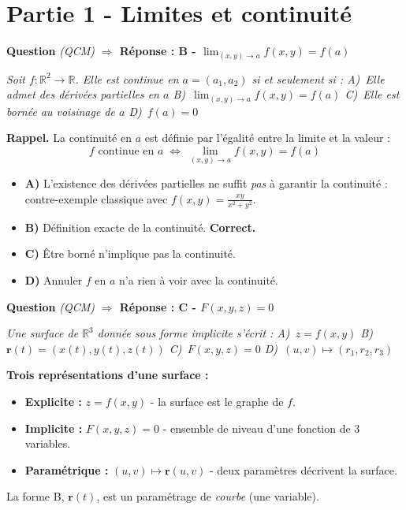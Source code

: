 \documentclass[11pt,a4paper]{article}
\newcounter{qnum}
\newcommand{\qtitre}[2]{%
  \stepcounter{qnum}%
  \medskip\noindent
  \textbf{\color{bleutexte}Question \theqnum}\enspace
  \textit{(#1)}\enspace
  \textcolor{vertok}{\textbf{$\Rightarrow$ Réponse : #2}}
  \par\smallskip
}
\newcommand{\qenonce}[1]{%
  \begin{mdframed}[backgroundcolor=grisbox, linewidth=0pt,
    innerleftmargin=8pt, innerrightmargin=8pt,
    innertopmargin=5pt, innerbottommargin=5pt,
    skipabove=2pt, skipbelow=4pt]
  \small\textit{#1}
  \end{mdframed}
}
\begin{document}
\section{Partie 1 - Limites et continuité}

\qtitre{QCM}{B - $\lim_{(x,y)\to a}f(x,y) = f(a)$}
\qenonce{Soit $f:\mathbb{R}^2\to\mathbb{R}$. Elle est continue en $a=(a_1,a_2)$ si et seulement si :
\quad A)~Elle admet des dérivées partielles en $a$
\quad B)~$\lim_{(x,y)\to a}f(x,y) = f(a)$
\quad C)~Elle est bornée au voisinage de $a$
\quad D)~$f(a) = 0$}

\begin{methodebox}
\textbf{Rappel.} La continuité en $a$ est définie par l'égalité entre la limite et la valeur :
$$f \text{ continue en } a \;\Longleftrightarrow\; \lim_{(x,y)\to a} f(x,y) = f(a)$$
\end{methodebox}

\begin{itemize}[leftmargin=1.5em, itemsep=2pt]
  \item \textcolor{rougeerr}{\textbf{A)}} L'existence des dérivées partielles ne suffit \emph{pas} à garantir la continuité : contre-exemple classique avec $f(x,y)=\frac{xy}{x^2+y^2}$.
  \item \textcolor{vertok}{\textbf{B)}} Définition exacte de la continuité. \textbf{Correct.}
  \item \textcolor{rougeerr}{\textbf{C)}} Être borné n'implique pas la continuité.
  \item \textcolor{rougeerr}{\textbf{D)}} Annuler $f$ en $a$ n'a rien à voir avec la continuité.
\end{itemize}

\qtitre{QCM}{C - $F(x,y,z) = 0$}
\qenonce{Une surface de $\mathbb{R}^3$ donnée sous forme implicite s'écrit :
\quad A)~$z = f(x,y)$
\quad B)~$\mathbf{r}(t) = (x(t),y(t),z(t))$
\quad C)~$F(x,y,z) = 0$
\quad D)~$(u,v)\mapsto(r_1,r_2,r_3)$}

\begin{methodebox}
\textbf{Trois représentations d'une surface :}
\begin{itemize}[itemsep=1pt, topsep=2pt]
  \item \textbf{Explicite :} $z = f(x,y)$ - la surface est le graphe de $f$.
  \item \textbf{Implicite :} $F(x,y,z) = 0$ - ensemble de niveau d'une fonction de 3 variables.
  \item \textbf{Paramétrique :} $(u,v)\mapsto\mathbf{r}(u,v)$ - deux paramètres décrivent la surface.
\end{itemize}
La forme B, $\mathbf{r}(t)$, est un paramétrage de \emph{courbe} (une variable).
\end{methodebox}
\end{document}
